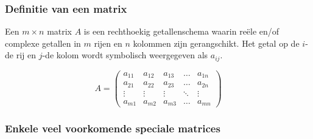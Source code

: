 
\subsubsection{Definitie van een matrix}

\begin{definitie}
	Een $m \times n$ matrix $A$ is een rechthoekig getallenschema waarin re\"{e}le en/of complexe getallen in $m$ rijen en $n$ kolommen zijn gerangschikt. Het getal op de $i$-de rij en $j$-de kolom wordt symbolisch weergegeven als $a_{ij}$.

\end{definitie}
\[
A= \left( \begin{matrix}
a_{11} & a_{12} & a_{13} & \ldots & a_{1n} \\
a_{21} & a_{22} & a_{23} & \ldots & a_{2n} \\
\vdots & \vdots & \vdots & \ddots & \vdots \\
a_{m1} & a_{m2} & a_{m3} & \ldots & a_{mn}
\end{matrix} \right)
\]

\subsubsection{Enkele veel voorkomende speciale matrices}

